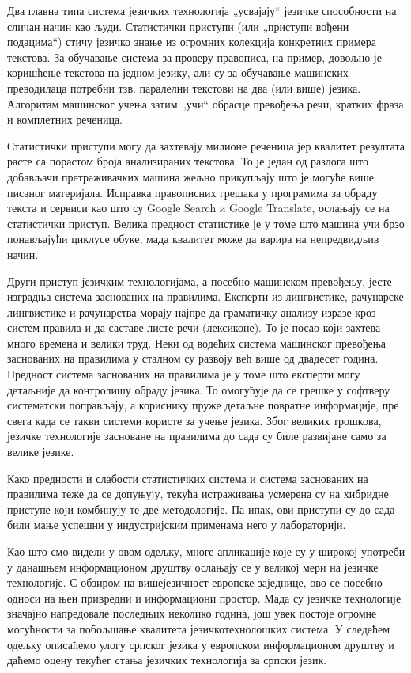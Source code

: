\begin{multicols}{2}
Два главна типа система језичких технологија „усвајају“ језичке способности на сличан начин као људи. Статистички приступи  (или „приступи вођени подацима“) стичу језичко знање из огромних колекција конкретних примера текстова. За обучавање система за проверу правописа, на пример, довољно је коришћење текстова на једном језику, али су за обучавање машинских преводилаца потребни тзв. паралелни текстови на два (или више) језика. Алгоритам машинског учења затим „учи“ обрасце превођења речи, кратких фраза и комплетних реченица. 

Статистички приступи могу да захтевају милионе реченица јер квалитет резултата расте са порастом броја анализираних текстова. То је један од разлога што добављачи претраживачких машина жељно прикупљају што је могуће више писаног материјала. Исправка правописних грешака у програмима за обраду текста и сервиси као што су Google Search и  Google Translate, ослањају се на статистички приступ. Велика предност статистике је у томе што машина учи брзо по\-нав\-ља\-ју\-ћи циклусе обуке, мада квалитет може да варира на непредвидљив начин. 

Други приступ језичким технологијама, а посебно машинском превођењу, јесте изградња система заснованих на правилима. Експерти из лингвистике, рачунарске лингвистике и рачунарства морају најпре да граматичку анализу изразе кроз систем правила и да саставе листе речи (лексиконе). То је посао који захтева много времена и велики труд. Неки од водећих система машинског превођења заснованих на правилима у сталном су развоју већ више од двадесет година. Предност система заснованих на правилима је у томе што експерти могу детаљније да контролишу обраду језика. То омогућује да се грешке у софтверу систематски поправљају, а кориснику пруже детаљне повратне информације, пре свега када се такви системи користе за учење језика. Због великих трошкова, језичке технологије засноване на правилима до сада су биле развијане само за велике језике.  

Како предности и слабости статистичких система и система заснованих на правилима теже да се допуњују, текућа истраживања усмерена су на хибридне приступе који комбинују те две методологије. Па ипак, ови приступи су до сада били мање успешни у индустријским применама него у лабораторији. 

Као што смо видели у овом одељку, многе апликације које су у широкој употреби у данашњем информационом друштву ослањају се у великој мери на језичке технологије. С обзиром на вишејезичност европске заједнице, ово се посебно односи на њен привредни и информациони простор. Мада су језичке технологије значајно напредовале последњих неколико година, још увек постоје огромне могућности за побољшање квалитета језичкотехнолошких система. У следећем одељку описаћемо улогу српског језика у европском информационом друштву и даћемо оцену текућег стања језичких технологија за српски језик. 

\end{multicols}

